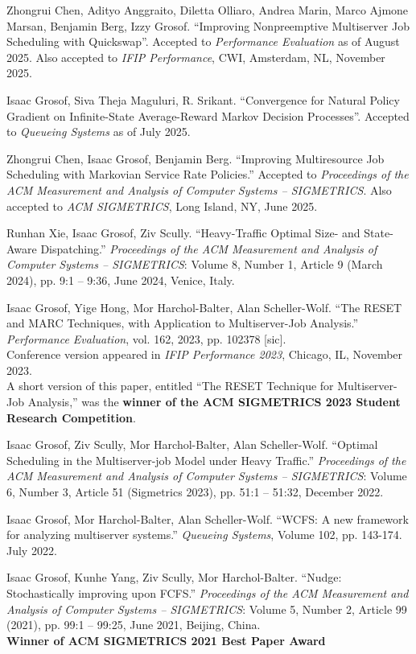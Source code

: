 \documentclass{res}
\begin{document}
\begin{resume}
    Zhongrui Chen, Adityo Anggraito, Diletta Olliaro, Andrea Marin, Marco Ajmone Marsan, Benjamin Berg, Izzy Grosof.
    ``Improving Nonpreemptive Multiserver Job Scheduling with Quickswap''.
    Accepted to \textit{Performance Evaluation} as of August 2025.
    Also accepted to \textit{IFIP Performance}, CWI, Amsterdam, NL, November 2025.

    Isaac Grosof, Siva Theja Maguluri, R. Srikant. ``Convergence for Natural Policy Gradient on Infinite-State Average-Reward Markov Decision Processes''.
    Accepted to \textit{Queueing Systems} as of July 2025.

    Zhongrui Chen, Isaac Grosof, Benjamin Berg. ``Improving Multiresource Job Scheduling with Markovian Service Rate Policies.''
    Accepted to \textit{Proceedings of the ACM Measurement and Analysis of Computer Systems -- SIGMETRICS}.
    Also accepted to \textit{ACM SIGMETRICS}, Long Island, NY, June 2025.

    Runhan Xie, Isaac Grosof, Ziv Scully.
    ``Heavy-Traffic Optimal Size- and State-Aware Dispatching.''
    \textit{Proceedings of the ACM Measurement and Analysis of Computer Systems -- SIGMETRICS}: Volume 8, Number 1, Article 9 (March 2024), pp. 9:1 -- 9:36, June 2024, Venice, Italy.

    Isaac Grosof, Yige Hong, Mor Harchol-Balter, Alan Scheller-Wolf.
    ``The RESET and MARC Techniques, with Application to Multiserver-Job Analysis.''
    \textit{Performance Evaluation}, vol. 162, 2023, pp. 102378 [sic].\\
    Conference version appeared in  \textit{IFIP Performance 2023}, Chicago, IL, November 2023. \\
    A short version of this paper, entitled ``The RESET Technique for Multiserver-Job Analysis,''
    was the \textbf{winner of the ACM SIGMETRICS 2023 Student Research Competition}.

    Isaac Grosof, Ziv Scully, Mor Harchol-Balter, Alan Scheller-Wolf.
    ``Optimal Scheduling in the Multiserver-job Model under Heavy Traffic.''
     \textit{Proceedings of the ACM Measurement and Analysis of Computer Systems -- SIGMETRICS}:
     Volume 6, Number 3, Article 51 (Sigmetrics 2023),
     pp. 51:1 -- 51:32, December 2022.

    Isaac Grosof, Mor Harchol-Balter, Alan Scheller-Wolf.
    ``WCFS: A new framework for analyzing multiserver systems.''
    \textit{Queueing Systems}, Volume 102, pp. 143-174. July 2022.

    Isaac Grosof, Kunhe Yang, Ziv Scully, Mor Harchol-Balter.
    ``Nudge: Stochastically improving upon FCFS.''
    \textit{Proceedings of the ACM Measurement and Analysis of Computer Systems -- SIGMETRICS}: Volume 5, Number 2, Article 99 (2021), pp. 99:1 -- 99:25, June 2021, Beijing, China.\\
    \textbf{Winner of ACM SIGMETRICS 2021 Best Paper Award}


\end{resume}
\end{document}
